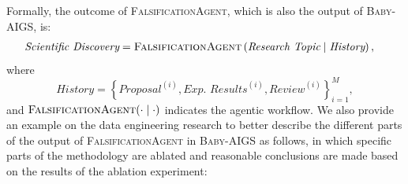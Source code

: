 \documentclass{article} %
\newcommand{\AIGSSys}{\textsc{Baby-AIGS}\xspace}
\newcommand{\FalsificationAgent}{\textsc{FalsificationAgent}\xspace}
\begin{document}
Formally, the outcome of \FalsificationAgent, which is also the output of \AIGSSys, is:
\begin{equation}
\begin{aligned}
\textit{Scientific Discovery} & = \text{\FalsificationAgent}\left(\textit{Research Topic} \mid \textit{History}\right), 
\end{aligned}
\end{equation}
where
\begin{equation}
\textit{History} = \left\{\textit{Proposal}^{(i)}, \textit{Exp. Results}^{(i)}, \textit{Review}^{(i)} \right\}_{i=1}^{M},
\end{equation}
and $\FalsificationAgent(\cdot \mid \cdot)$ indicates the agentic workflow. 
We also provide an example on the data engineering research to better describe the different parts of the output of \FalsificationAgent in \AIGSSys as follows, in which specific parts of the methodology are ablated and reasonable conclusions are made based on the results of the ablation experiment:

\end{document}
